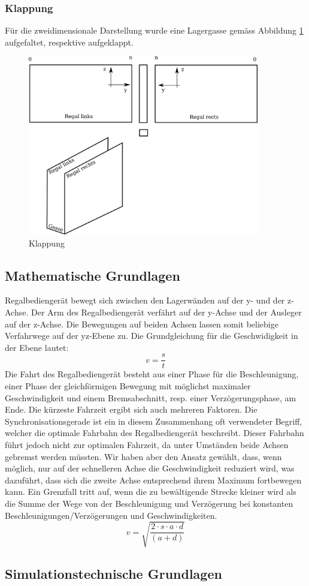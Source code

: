 \subsubsection{Klappung}
Für die zweidimensionale Darstellung wurde eine Lagergasse gemäss Abbildung \ref{fig:klapp} aufgefaltet, respektive aufgeklappt.
%
\begin{figure}[h]
  \begin{center}
    \includegraphics[width=0.9\textwidth]{images/klappung.png}
    \caption{Klappung}
    \label{fig:klapp}
  \end{center}
\end{figure}

%
\subsection{Mathematische Grundlagen}
Regalbediengerät bewegt sich zwischen den Lagerwänden auf der y- und der z-Achse. Der Arm des Regalbediengerät verfährt auf der y-Achse und der Ausleger auf der z-Achse. Die Bewegungen auf beiden Achsen lassen somit beliebige Verfahrwege auf der yz-Ebene zu. 
%
Die Grundgleichung für die Geschwidigkeit in der Ebene lautet:
%
\begin{equation}
v = \frac{s}{t}
\end{equation}
%
Die Fahrt des Regalbediengerät besteht aus einer Phase für die Beschleunigung, einer Phase der gleichförmigen Bewegung mit möglichst maximaler Geschwindigkeit und einem Bremsabschnitt, resp. einer Verzögerungsphase, am Ende. 
%
Die kürzeste Fahrzeit ergibt sich auch mehreren Faktoren. Die Synchronisationsgerade ist ein in diesem Zusammenhang oft verwendeter Begriff, welcher die optimale Fahrbahn des Regalbediengerät beschreibt. Dieser Fahrbahn führt jedoch nicht zur optimalen Fahrzeit, da unter Umständen beide Achsen gebremst werden müssten. Wir haben aber den Ansatz gewählt, dass, wenn möglich, nur auf der schnelleren Achse die Geschwindigkeit reduziert wird, was dazuführt, dass sich die zweite Achse entsprechend ihrem Maximum fortbewegen kann.
%
Ein Grenzfall tritt auf, wenn die zu bewältigende Strecke kleiner wird als die Summe der Wege von der Beschleunigung und Verzögerung bei konstanten Beschleunigungen/Verzögerungen und Geschwindigkeiten. 
%
\begin{equation}
v = \sqrt{\frac{2 \cdot s \cdot a \cdot d}{(a+d)}}
\end{equation}
%
\subsection{Simulationstechnische Grundlagen}





